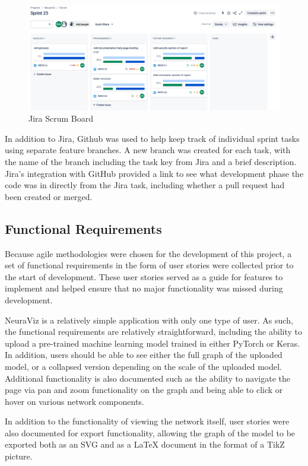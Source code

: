 \begin{figure}[htb]
    \centering
    \includegraphics[width=1\textwidth]{02_dev_process/res/jira_board_sprint_25.png}
    \caption[Jira Scrum Board]{Jira Scrum Board}
    \label{fig:jira_scrum_board}
\end{figure}

In addition to Jira, Github was used to help keep track of individual sprint tasks using separate feature branches. A new branch was created for each task, with the name of the branch including the task key from Jira and a brief description. Jira's integration with GitHub provided a link to see what development phase the code was in directly from the Jira task, including whether a pull request had been created or merged.

\subsection{Functional Requirements}
Because agile methodologies were chosen for the development of this project, a set of functional requirements in the form of user stories were collected prior to the start of development. These user stories served as a guide for features to implement and helped ensure that no major functionality was missed during development.

NeuraViz is a relatively simple application with only one type of user. As such, the functional requirements are relatively straightforward, including the ability to upload a pre-trained machine learning model trained in either PyTorch or Keras. In addition, users should be able to see either the full graph of the uploaded model, or a collapsed version depending on the scale of the uploaded model. Additional functionality is also documented such as the ability to navigate the page via pan and zoom functionality on the graph and being able to click or hover on various network components. 

In addition to the functionality of viewing the network itself, user stories were also documented for export functionality, allowing the graph of the model to be exported both as an SVG and as a \LaTeX{} document in the format of a TikZ picture. 

